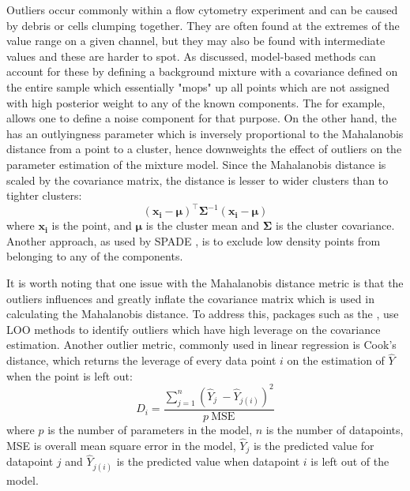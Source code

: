 Outliers occur commonly within a flow cytometry experiment and can be caused by debris or cells clumping together.
They are often found at the extremes of the value range on a given channel, but they may also be found with intermediate values and these are harder to spot. %
As discussed, model-based methods can account for these by defining a background mixture with a covariance defined on the entire sample which essentially "mops" up all points which are not assigned with high posterior weight to any of the known components.
The  for example, allows one to define a noise component for that purpose.
On the other hand, the  has an outlyingness parameter which is inversely proportional to the Mahalanobis distance from a point to a cluster, hence downweights the effect of outliers on the parameter estimation of the mixture model.
Since the Mahalanobis distance is scaled by the covariance matrix, the distance is lesser to wider clusters than to tighter clusters:
\begin{equation} \label{equation:Mahalanobis}
(\boldsymbol{x_i}-\boldsymbol{\mu})^{\top}\boldsymbol{\Sigma}^{-1}(\boldsymbol{x_i}-\boldsymbol{\mu})
\end{equation}
where $\boldsymbol{x_i}$ is the point, and $\boldsymbol{\mu}$ is the cluster mean and $\boldsymbol{\Sigma}$ is the cluster covariance.
Another approach, as used by SPADE \citep{Simonds:2011jh}, is to exclude low density points from belonging to any of the components.

It is worth noting that one issue with the Mahalanobis distance metric is that the outliers influences and greatly inflate the covariance matrix which is used in calculating the Mahalanobis distance.
To address this, packages such as the , use \gls{LOO} methods to identify outliers which have high leverage on the covariance estimation.
Another outlier metric, commonly used in linear regression is Cook's distance, which returns the leverage of every data point $i$  on the estimation of $\hat Y$ when the point is left out:
\[
D_i = \frac{ \sum_{j=1}^n (\hat Y_j\ - \hat Y_{j(i)})^2 }{p \ \mathrm{MSE}}
\]
where $p$ is the number of parameters in the model, $n$ is the number of datapoints, MSE is overall mean square error in the model, $ \hat Y_j $ is the predicted value for datapoint $j$ and $ \hat Y_{j(i)} $ is the predicted value when datapoint $i$ is left out of the model.

